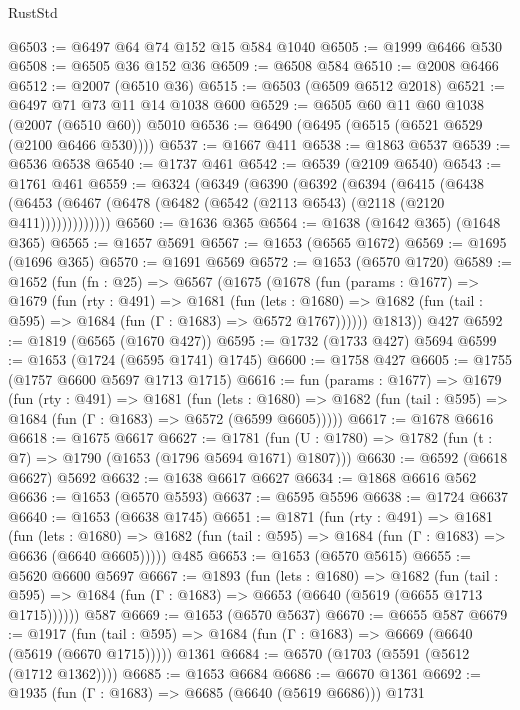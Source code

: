 \begin{lexlean}{RustStd}
\begin{coremodule}
@6503 := @6497 @64 @74 @152 @15 @584 @1040
@6505 := @1999 @6466 @530
@6508 := @6505 @36 @152 @36
@6509 := @6508 @584
@6510 := @2008 @6466
@6512 := @2007 (@6510 @36)
@6515 := @6503 (@6509 @6512 @2018)
@6521 := @6497 @71 @73 @11 @14 @1038 @600
@6529 := @6505 @60 @11 @60 @1038 (@2007 (@6510 @60)) @5010
@6536 := @6490 (@6495 (@6515 (@6521 @6529 (@2100 @6466 @530))))
@6537 := @1667 @411
@6538 := @1863 @6537
@6539 := @6536 @6538
@6540 := @1737 @461
@6542 := @6539 (@2109 @6540)
@6543 := @1761 @461
@6559 := @6324
    (@6349
      (@6390
        (@6392
          (@6394
            (@6415
              (@6438
                (@6453 (@6467 (@6478 (@6482 (@6542 (@2113 @6543) (@2118 (@2120 @411)))))))))))))
@6560 := @1636 @365
@6564 := @1638 (@1642 @365) (@1648 @365)
@6565 := @1657 @5691
@6567 := @1653 (@6565 @1672)
@6569 := @1695 (@1696 @365)
@6570 := @1691 @6569
@6572 := @1653 (@6570 @1720)
@6589 := @1652
    (fun (fn : @25) =>
    @6567
      (@1675
        (@1678
          (fun (params : @1677) =>
          @1679
            (fun (rty : @491) =>
            @1681
              (fun (lets : @1680) =>
              @1682 (fun (tail : @595) => @1684 (fun (Γ : @1683) => @6572 @1767))))))
        @1813))
    @427
@6592 := @1819 (@6565 (@1670 @427))
@6595 := @1732 (@1733 @427) @5694
@6599 := @1653 (@1724 (@6595 @1741) @1745)
@6600 := @1758 @427
@6605 := @1755 (@1757 @6600 @5697 @1713 @1715)
@6616 := fun (params : @1677) =>
  @1679
    (fun (rty : @491) =>
    @1681
      (fun (lets : @1680) =>
      @1682 (fun (tail : @595) => @1684 (fun (Γ : @1683) => @6572 (@6599 @6605)))))
@6617 := @1678 @6616
@6618 := @1675 @6617
@6627 := @1781 (fun (U : @1780) => @1782 (fun (t : @7) => @1790 (@1653 (@1796 @5694 @1671) @1807)))
@6630 := @6592 (@6618 @6627) @5692
@6632 := @1638 @6617 @6627
@6634 := @1868 @6616 @562
@6636 := @1653 (@6570 @5593)
@6637 := @6595 @5596
@6638 := @1724 @6637
@6640 := @1653 (@6638 @1745)
@6651 := @1871
    (fun (rty : @491) =>
    @1681
      (fun (lets : @1680) =>
      @1682 (fun (tail : @595) => @1684 (fun (Γ : @1683) => @6636 (@6640 @6605)))))
    @485
@6653 := @1653 (@6570 @5615)
@6655 := @5620 @6600 @5697
@6667 := @1893
    (fun (lets : @1680) =>
    @1682
      (fun (tail : @595) => @1684 (fun (Γ : @1683) => @6653 (@6640 (@5619 (@6655 @1713 @1715))))))
    @587
@6669 := @1653 (@6570 @5637)
@6670 := @6655 @587
@6679 := @1917
    (fun (tail : @595) => @1684 (fun (Γ : @1683) => @6669 (@6640 (@5619 (@6670 @1715)))))
    @1361
@6684 := @6570 (@1703 (@5591 (@5612 (@1712 @1362))))
@6685 := @1653 @6684
@6686 := @6670 @1361
@6692 := @1935 (fun (Γ : @1683) => @6685 (@6640 (@5619 @6686))) @1731

\end{coremodule}
\end{lexlean}
